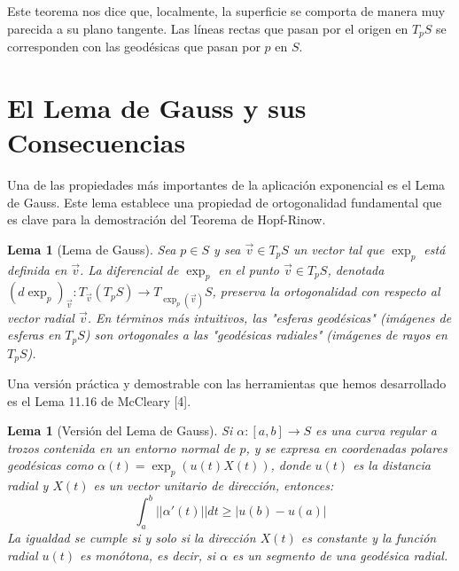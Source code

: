 \documentclass[12pt, a4paper]{report}
\theoremstyle{miestilo}
\newtheorem{lema}[teorema]{Lema}
\theoremstyle{midefinicion}
\begin{document}
Este teorema nos dice que, localmente, la superficie se comporta de manera muy parecida a su plano tangente. Las líneas rectas que pasan por el origen en $T_pS$ se corresponden con las geodésicas que pasan por $p$ en $S$.

\section{El Lema de Gauss y sus Consecuencias}

Una de las propiedades más importantes de la aplicación exponencial es el Lema de Gauss. Este lema establece una propiedad de ortogonalidad fundamental que es clave para la demostración del Teorema de Hopf-Rinow.

\begin{lema}[Lema de Gauss]
Sea $p \in S$ y sea $\vec{v} \in T_pS$ un vector tal que $\exp_p$ está definida en $\vec{v}$. La diferencial de $\exp_p$ en el punto $\vec{v} \in T_pS$, denotada $(d\exp_p)_{\vec{v}}: T_{\vec{v}}(T_pS) \to T_{\exp_p(\vec{v})}S$, preserva la ortogonalidad con respecto al vector radial $\vec{v}$. En términos más intuitivos, las "esferas geodésicas" (imágenes de esferas en $T_pS$) son ortogonales a las "geodésicas radiales" (imágenes de rayos en $T_pS$).
\end{lema}

Una versión práctica y demostrable con las herramientas que hemos desarrollado es el Lema 11.16 de McCleary [4].

\begin{lema}[Versión del Lema de Gauss]
Si $\alpha:[a,b]\to S$ es una curva regular a trozos contenida en un entorno normal de $p$, y se expresa en coordenadas polares geodésicas como $\alpha(t) = \exp_p(u(t)X(t))$, donde $u(t)$ es la distancia radial y $X(t)$ es un vector unitario de dirección, entonces:
$$\int_a^b ||\alpha'(t)|| dt \ge |u(b) - u(a)|$$
La igualdad se cumple si y solo si la dirección $X(t)$ es constante y la función radial $u(t)$ es monótona, es decir, si $\alpha$ es un segmento de una geodésica radial.
\end{lema}
\end{document}
